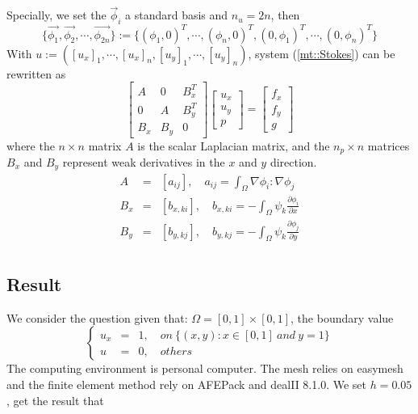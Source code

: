 \documentclass[a4paper]{article}
\begin{document}
Specially, we set the {$\vec{\phi}_i$} a standard basis and $n_u = 2n$, then
\begin{equation}
\{\vec{\phi_1},\vec{\phi_2},\cdots,\vec{\phi_{2n}} \}:=\{(\phi_1,0)^T,\cdots,(\phi_n,0)^T,(0,\phi_1)^T,\cdots,(0,\phi_n)^T\}
\label{eq::basisfunction}
\end{equation}
With $u:=([u_x]_1,\cdots,[u_x]_n,[u_y]_1,\cdots,[u_y]_n)$, system (\ref{mt::Stokes}) can be rewritten as
\begin{equation}
\left[ \begin{array}{ccc}
A & 0 & B_x^T \\
0 & A & B_y^T \\
B_x & B_y & 0
\end{array}
\right]
\left[\begin{array}{ccc}
u_x\\
u_y\\
p
\end{array}
\right]=
\left[\begin{array}{ccc}
f_x\\
f_y\\
g
\end{array}
\right]
\label{Stokes}
\end{equation}
where the $n\times n$ matrix $A$ is the scalar Laplacian matrix, and the $n_p\times n$ matrices $B_x$ and $B_y$ represent weak derivatives in the $x$ and $y$ direction. 	
\begin{equation}
\begin{array}{rcl}
A &=& [a_{ij}], \quad a_{ij} = \int_{\Omega} \nabla \phi_i : \nabla \phi_j \\
B_x &=& [b_{x,ki}], \quad b_{x,ki} = -\int_{\Omega} \psi_k \frac{\partial \phi_i}{\partial x} \\
B_y &=& [b_{y,kj}], \quad b_{y,kj} = -\int_{\Omega} \psi_k \frac{\partial \phi_j}{\partial y} \\
\end{array}
\label{Stokes-mtvalue}
\end{equation}

\subsection{Result}
We consider the question given that: $\Omega = [0,1]\times[0,1]$, the boundary value
\begin{equation}
\left\lbrace
\begin{array}{rcl}
u_x &=& 1,\quad on \ \{(x,y): x \in [0,1] \ and \ y = 1\}\\
u &=& 0,\quad others
\end{array}
\right.
\label{bd::value1}
\end{equation}
The computing environment is personal computer. The mesh relies on easymesh and the finite element method rely on AFEPack and dealII 8.1.0. We set $h=0.05$, get the result that
\end{document}

